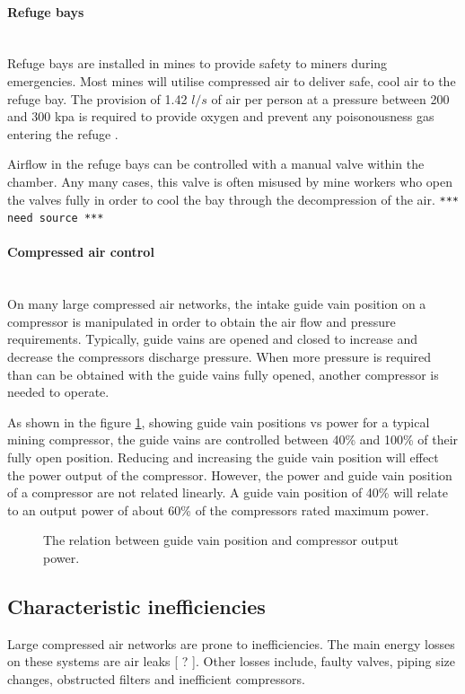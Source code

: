 \paragraph*{Refuge bays}\leavevmode\\
Refuge bays are installed in mines to provide safety to miners during emergencies. Most mines will utilise compressed air to deliver safe, cool air to the refuge bay. The provision of 1.42 $l/s$ of air per person at a pressure between 200 and 300 \gls{kpa} is required to provide oxygen and prevent any poisonousness gas entering the refuge \cite{brake1999criteria}.\par
Airflow in the refuge bays can be controlled with a manual valve within the chamber. Any many cases, this valve is often misused by mine workers who open the valves fully in order to cool the bay through the decompression of the air. \texttt{*** need source ***}
\paragraph*{Compressed air control}\leavevmode\\
On many large compressed air networks, the intake guide vain position on a compressor is manipulated in order to obtain the air flow and pressure requirements. Typically, guide vains are opened and closed to increase and decrease the compressors discharge pressure. When more pressure is required than can be obtained with the guide vains fully opened, another compressor is needed to operate.\par
 As shown in the figure \ref{fig: Guide vain position}, showing guide vain positions vs power for a typical mining compressor, the guide vains are controlled between 40\% and 100\% of their fully open position. Reducing and increasing the guide vain position will effect the power output of the compressor. However,  the power and guide vain position of a compressor are not related linearly. A guide vain position of 40\% will relate to an output power of about 60\% of the compressors rated maximum power.
 	\begin{figure}[h]
 	\centering
 	\fbox{}
 	\caption[The relation between guide vain position and compressor output power.]{The relation between guide vain position and compressor output power.}
 	\label{fig: Guide vain position}
 \end{figure}
 
	\subsection{Characteristic inefficiencies}
	Large compressed air networks are prone to inefficiencies. The main energy losses on these systems are air leaks [ ? ]. Other losses include, faulty valves, piping size changes, obstructed filters and inefficient compressors. \par
	
